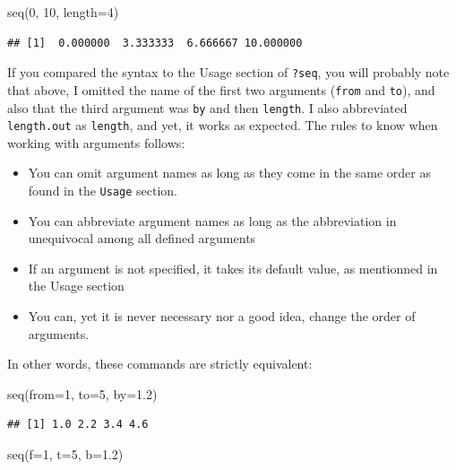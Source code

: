 \documentclass[
]{book}
\newenvironment{Shaded}{\begin{snugshade}}{\end{snugshade}}
\newcommand{\AttributeTok}[1]{\textcolor[rgb]{0.77,0.63,0.00}{#1}}
\newcommand{\DecValTok}[1]{\textcolor[rgb]{0.00,0.00,0.81}{#1}}
\newcommand{\FloatTok}[1]{\textcolor[rgb]{0.00,0.00,0.81}{#1}}
\newcommand{\FunctionTok}[1]{\textcolor[rgb]{0.00,0.00,0.00}{#1}}
\newcommand{\NormalTok}[1]{#1}
\providecommand{\tightlist}{%
  \setlength{\itemsep}{0pt}\setlength{\parskip}{0pt}}
\begin{document}
\begin{Shaded}
\begin{Highlighting}[]
\FunctionTok{seq}\NormalTok{(}\DecValTok{0}\NormalTok{, }\DecValTok{10}\NormalTok{, }\AttributeTok{length=}\DecValTok{4}\NormalTok{)}
\end{Highlighting}
\end{Shaded}

\begin{verbatim}
## [1]  0.000000  3.333333  6.666667 10.000000
\end{verbatim}

If you compared the syntax to the Usage section of \texttt{?seq}, you will probably note that above, I omitted the name of the first two arguments (\texttt{from} and \texttt{to}), and also that the third argument was \texttt{by} and then \texttt{length}. I also abbreviated \texttt{length.out} as \texttt{length}, and yet, it works as expected. The rules to know when working with arguments follows:

\begin{itemize}
\tightlist
\item
  You can omit argument names as long as they come in the same order as found in the \texttt{Usage} section.
\item
  You can abbreviate argument names as long as the abbreviation in unequivocal among all defined arguments
\item
  If an argument is not specified, it takes its default value, as mentionned in the Usage section
\item
  You can, yet it is never necessary nor a good idea, change the order of arguments.
\end{itemize}

In other words, these commands are strictly equivalent:

\begin{Shaded}
\begin{Highlighting}[]
\FunctionTok{seq}\NormalTok{(}\AttributeTok{from=}\DecValTok{1}\NormalTok{, }\AttributeTok{to=}\DecValTok{5}\NormalTok{, }\AttributeTok{by=}\FloatTok{1.2}\NormalTok{)}
\end{Highlighting}
\end{Shaded}

\begin{verbatim}
## [1] 1.0 2.2 3.4 4.6
\end{verbatim}

\begin{Shaded}
\begin{Highlighting}[]
\FunctionTok{seq}\NormalTok{(}\AttributeTok{f=}\DecValTok{1}\NormalTok{, }\AttributeTok{t=}\DecValTok{5}\NormalTok{, }\AttributeTok{b=}\FloatTok{1.2}\NormalTok{)}
\end{Highlighting}
\end{Shaded}
\end{document}
